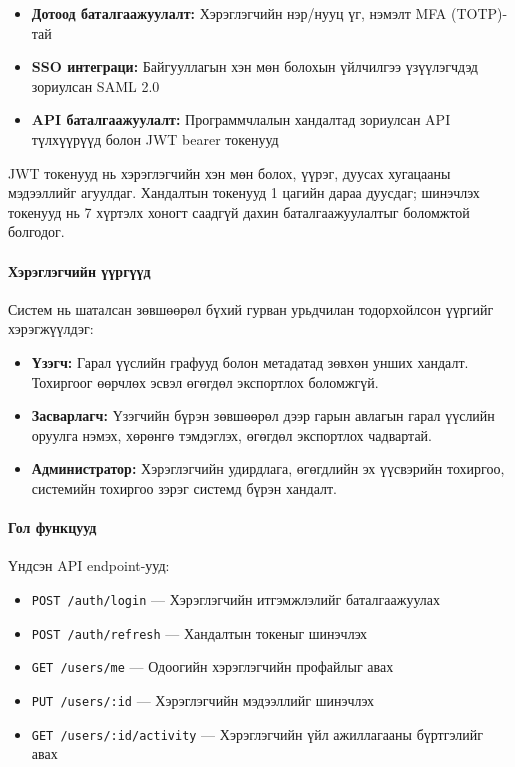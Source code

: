 \begin{itemize}
    \item \textbf{Дотоод баталгаажуулалт:} Хэрэглэгчийн нэр/нууц үг, нэмэлт MFA (TOTP)-тай
    \item \textbf{SSO интеграци:} Байгууллагын хэн мөн болохын үйлчилгээ үзүүлэгчдэд зориулсан SAML 2.0
    \item \textbf{API баталгаажуулалт:} Программчлалын хандалтад зориулсан API түлхүүрүүд болон JWT bearer токенууд
\end{itemize}

JWT токенууд нь хэрэглэгчийн хэн мөн болох, үүрэг, дуусах хугацааны мэдээллийг агуулдаг. Хандалтын токенууд 1 цагийн дараа дуусдаг; шинэчлэх токенууд нь 7 хүртэлх хоногт саадгүй дахин баталгаажуулалтыг боломжтой болгодог.

\paragraph{Хэрэглэгчийн үүргүүд}
Систем нь шаталсан зөвшөөрөл бүхий гурван урьдчилан тодорхойлсон үүргийг хэрэгжүүлдэг:

\begin{itemize}
    \item \textbf{Үзэгч:} Гарал үүслийн графууд болон метадатад зөвхөн унших хандалт. Тохиргоог өөрчлөх эсвэл өгөгдөл экспортлох боломжгүй.
    
    \item \textbf{Засварлагч:} Үзэгчийн бүрэн зөвшөөрөл дээр гарын авлагын гарал үүслийн оруулга нэмэх, хөрөнгө тэмдэглэх, өгөгдөл экспортлох чадвартай.
    
    \item \textbf{Администратор:} Хэрэглэгчийн удирдлага, өгөгдлийн эх үүсвэрийн тохиргоо, системийн тохиргоо зэрэг системд бүрэн хандалт.
\end{itemize}

\paragraph{Гол функцууд}
Үндсэн API endpoint-ууд:
\begin{itemize}
    \item \texttt{POST /auth/login} --- Хэрэглэгчийн итгэмжлэлийг баталгаажуулах
    \item \texttt{POST /auth/refresh} --- Хандалтын токеныг шинэчлэх
    \item \texttt{GET /users/me} --- Одоогийн хэрэглэгчийн профайлыг авах
    \item \texttt{PUT /users/:id} --- Хэрэглэгчийн мэдээллийг шинэчлэх
    \item \texttt{GET /users/:id/activity} --- Хэрэглэгчийн үйл ажиллагааны бүртгэлийг авах
\end{itemize}

